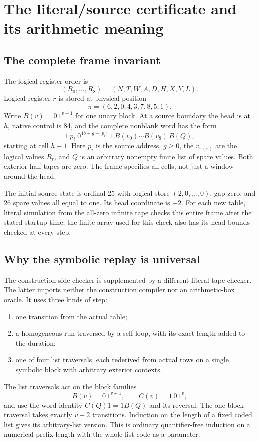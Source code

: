 \documentclass[11pt,a4paper]{article}
\begin{document}
\section{The literal/source certificate and its arithmetic meaning}
\label{sec:physical}

\subsection{The complete frame invariant}
The logical register order is
\[
(R_0,\ldots,R_8)=(N,T,W,A,D,H,X,Y,L).
\]
Logical register $r$ is stored at physical position
\[
\pi=(6,2,0,4,3,7,8,5,1).
\]
Write $B(v)=0\,1^{v+1}$ for one unary block. At a source boundary the
head is at $h$, native control is 84, and the complete nonblank word has
the form
\[
1\;p_i\;0^{48+g-|p_i|}\;1\;
B(v_0)\cdots B(v_8)\,B(Q),                         \tag{1}
\]
starting at cell $h-1$. Here $p_i$ is the source address, $g\ge0$, the
$v_{\pi(r)}$ are the logical values $R_r$, and $Q$ is an arbitrary
nonempty finite list of spare values. Both exterior half-tapes are zero.
The frame specifies all cells, not just a window around the head.

The initial source state is ordinal 25 with logical store $(2,0,\ldots,0)$,
gap zero, and 26 spare values all equal to one. Its head coordinate is $-2$.
For each new table, literal simulation from the all-zero infinite tape
checks this entire frame after the stated startup time; the finite array
used for this check also has its head bounds checked at every step.

\subsection{Why the symbolic replay is universal}
The construction-side checker is supplemented by a different literal-tape
checker. The latter imports neither the construction compiler nor an
arithmetic-box oracle. It uses three kinds of step:
\begin{enumerate}
\item one transition from the actual table;
\item a homogeneous run traversed by a self-loop, with its exact length
added to the duration;
\item one of four list traversals, each rederived from actual rows on a
single symbolic block with arbitrary exterior contexts.
\end{enumerate}
The list traversals act on the block families
\[
B(v)=0\,1^{v+1},\qquad C(v)=1\,0\,1^v,
\]
and use the word identity $C(Q)1=1B(Q)$ and its reversal. The one-block
traversal takes exactly $v+2$ transitions. Induction on the length of a
fixed coded list gives its arbitrary-list version. This is ordinary
quantifier-free induction on a numerical prefix length with the whole
list code as a parameter.
\end{document}
